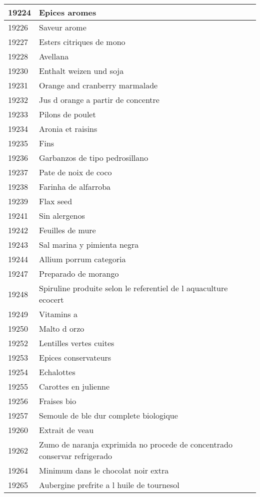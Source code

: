 \begin{longtable}{|l|l|}
19224 & Epices aromes \\ \hline 
19226 & Saveur arome \\ \hline 
19227 & Esters citriques de mono \\ \hline 
19228 & Avellana \\ \hline 
19230 & Enthalt weizen und soja \\ \hline 
19231 & Orange and cranberry marmalade \\ \hline 
19232 & Jus d orange a partir de concentre \\ \hline 
19233 & Pilons de poulet \\ \hline 
19234 & Aronia et raisins \\ \hline 
19235 & Fins \\ \hline 
19236 & Garbanzos de tipo pedrosillano \\ \hline 
19237 & Pate de noix de coco \\ \hline 
19238 & Farinha de alfarroba \\ \hline 
19239 & Flax seed \\ \hline 
19241 & Sin alergenos \\ \hline 
19242 & Feuilles de mure \\ \hline 
19243 & Sal marina y pimienta negra \\ \hline 
19244 & Allium porrum categoria \\ \hline 
19247 & Preparado de morango \\ \hline 
19248 & Spiruline produite selon le referentiel de l aquaculture ecocert \\ \hline 
19249 & Vitamins a \\ \hline 
19250 & Malto d orzo \\ \hline 
19252 & Lentilles vertes cuites \\ \hline 
19253 & Epices conservateurs \\ \hline 
19254 & Echalottes \\ \hline 
19255 & Carottes en julienne \\ \hline 
19256 & Fraises bio \\ \hline 
19257 & Semoule de ble dur complete biologique \\ \hline 
19260 & Extrait de veau \\ \hline 
19262 & Zumo de naranja exprimida no procede de concentrado conservar refrigerado \\ \hline 
19264 & Minimum dans le chocolat noir extra \\ \hline 
19265 & Aubergine prefrite a l huile de tournesol \\ \hline 

\end{longtable}
